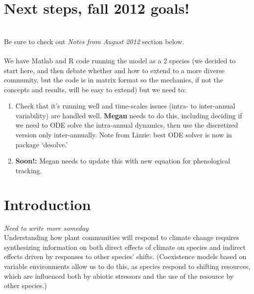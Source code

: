 \documentclass[11pt,a4paper,oneside]{article}
\begin{document}
\section{Next steps, fall 2012 goals!}
\\
\noindent Be sure to check out \emph{Notes from August 2012} section below.\\
\\
\noindent We have Matlab and R code running the model as a 2 species
(we decided to start here, and then debate whether and how to extend
to a more diverse community, but the code is in matrix format so the
mechanics, if not the concepts and results, will be easy to extend) but we need
to:
\begin{enumerate}
\item Check that it's running well and time-scales issues (intra- to
  inter-annual variability) are handled well. {\bf Megan} needs to do
  this, including deciding if we need to ODE solve the intra-annual
  dynamics, then use the discretized version only inter-annually. Note from Lizzie: best ODE solver is now in package `desolve.'
\item{\bf Soon!:} Megan needs to update this with new equation for phenological tracking.
\end{enumerate}

\section{Introduction}
\noindent \emph{Need to write more someday} \\
\noindent Understanding how plant communities will respond to climate change
requires synthesizing information on both direct effects of climate on species
and indirect effects driven by responses to other species'
shifts. (Coexistence models based on variable environments allow us to
do this, as species respond to shifting resources, which are
influenced both by abiotic stressors and the use of the resource by
other species.)
\end{document}
